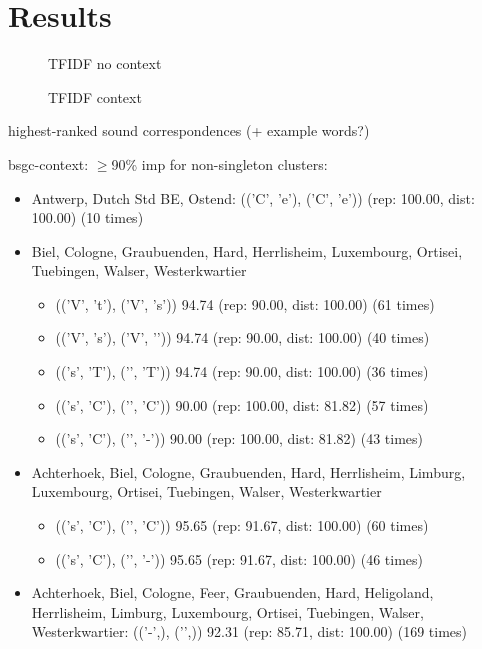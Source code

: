 \documentclass{article}
\begin{document}
\section{Results}

\begin{figure}
  
  \caption{TFIDF no context}
  \label{fig:tfidf-nocontext}
\end{figure}

\begin{figure}
  
  \caption{TFIDF context}
  \label{fig:tfidf-context}
\end{figure}

highest-ranked sound correspondences
(+ example words?)

bsgc-context: $\geq$90\% imp for non-singleton clusters:
\begin{itemize}
\item Antwerp, Dutch Std BE, Ostend:
(('C', 'e'), ('C', 'e\textlengthmark')) (rep: 100.00, dist: 100.00) (10 times)
\item Biel, Cologne, Graubuenden, Hard, Herrlisheim, Luxembourg, Ortisei, Tuebingen, Walser, Westerkwartier
\begin{itemize}
\item (('V', 't'), ('V', 's'))  94.74 (rep: 90.00, dist: 100.00)  (61 times)
\item (('V', 's'), ('V', '\textesh')) 94.74 (rep: 90.00, dist: 100.00)  (40 times)
\item (('s', 'T'), ('\textesh', 'T')) 94.74 (rep: 90.00, dist: 100.00)  (36 times)
\item (('s', 'C'), ('\textesh', 'C')) 90.00 (rep: 100.00, dist: 81.82)  (57 times)
\item (('s', 'C'), ('\textesh', '-')) 90.00 (rep: 100.00, dist: 81.82)  (43 times)
\end{itemize}
\item Achterhoek, Biel, Cologne, Graubuenden, Hard, Herrlisheim, Limburg, Luxembourg, Ortisei, Tuebingen, Walser, Westerkwartier
\begin{itemize}
\item (('s', 'C'), ('\textesh', 'C')) 95.65 (rep: 91.67, dist: 100.00)  (60 times)
\item (('s', 'C'), ('\textesh', '-')) 95.65 (rep: 91.67, dist: 100.00)  (46 times)
\end{itemize}
\item Achterhoek, Biel, Cologne, Feer, Graubuenden, Hard, Heligoland, Herrlisheim, Limburg, Luxembourg, Ortisei, Tuebingen, Walser, Westerkwartier: 
(('-',), ('\textglotstop',))  92.31 (rep: 85.71, dist: 100.00)  (169 times)
\end{itemize}
\end{document}

